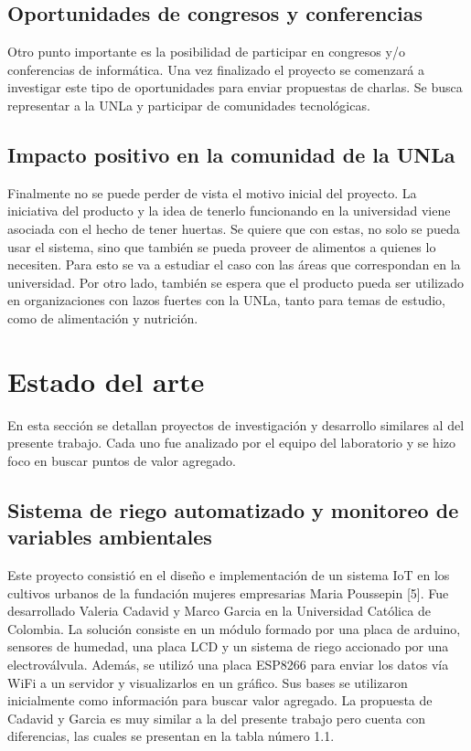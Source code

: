 \subsection{Oportunidades de congresos y conferencias}
Otro punto importante es la posibilidad de participar en congresos y/o conferencias de informática. Una vez finalizado el proyecto se comenzará a investigar este tipo de oportunidades para enviar propuestas de charlas. Se busca representar a la UNLa y participar de comunidades tecnológicas.

\subsection{Impacto positivo en la comunidad de la UNLa}
Finalmente no se puede perder de vista el motivo inicial del proyecto. La iniciativa del producto y la idea de tenerlo funcionando en la universidad viene asociada con el hecho de tener huertas. Se quiere que con estas, no solo se pueda usar el sistema, sino que también se pueda proveer de alimentos a quienes lo necesiten. Para esto se va a estudiar el caso con las áreas que correspondan en la universidad. Por otro lado, también se espera que el producto pueda ser utilizado en organizaciones con lazos fuertes con la UNLa, tanto para temas de estudio, como de alimentación y nutrición.


\section{Estado del arte}
En esta sección se detallan proyectos de investigación y desarrollo similares al del presente trabajo. Cada uno fue analizado por el equipo del laboratorio y se hizo foco en buscar puntos de valor agregado.\\

\subsection{Sistema de riego automatizado y monitoreo de variables ambientales}
Este proyecto consistió en el diseño e implementación de un sistema IoT en los cultivos urbanos de la fundación mujeres empresarias Maria Poussepin [5].
Fue desarrollado Valeria Cadavid y Marco Garcia en la Universidad Católica de Colombia.
La solución consiste en un módulo formado por una placa de arduino, sensores de humedad, una placa LCD y un sistema de riego accionado por una electroválvula. Además, se utilizó una placa ESP8266 para enviar los datos vía WiFi a un servidor y visualizarlos en un gráfico. Sus bases se utilizaron inicialmente como información para buscar valor agregado. La propuesta de Cadavid y Garcia es muy similar a la del presente trabajo pero cuenta con diferencias, las cuales se presentan en la tabla número 1.1.\\

